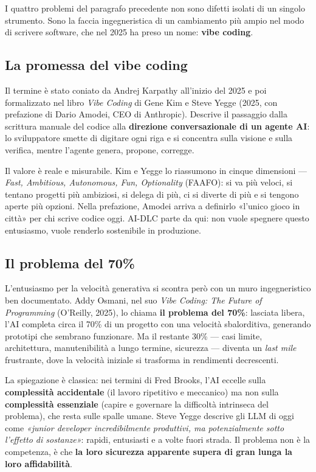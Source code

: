 I quattro problemi del paragrafo precedente non sono difetti isolati di un singolo strumento. Sono la faccia ingegneristica di un cambiamento più ampio nel modo di scrivere software, che nel 2025 ha preso un nome: \textbf{vibe coding}.

\subsection*{La promessa del vibe coding}

Il termine è stato coniato da Andrej Karpathy all'inizio del 2025 e poi formalizzato nel libro \textit{Vibe Coding} di Gene Kim e Steve Yegge (2025, con prefazione di Dario Amodei, CEO di Anthropic). Descrive il passaggio dalla scrittura manuale del codice alla \textbf{direzione conversazionale di un agente AI}: lo sviluppatore smette di digitare ogni riga e si concentra sulla visione e sulla verifica, mentre l'agente genera, propone, corregge.

Il valore è reale e misurabile. Kim e Yegge lo riassumono in cinque dimensioni --- \textit{Fast, Ambitious, Autonomous, Fun, Optionality} (FAAFO): si va più veloci, si tentano progetti più ambiziosi, si delega di più, ci si diverte di più e si tengono aperte più opzioni. Nella prefazione, Amodei arriva a definirlo «l'unico gioco in città» per chi scrive codice oggi. AI-DLC parte da qui: non vuole spegnere questo entusiasmo, vuole renderlo sostenibile in produzione.

\subsection*{Il problema del 70\%}

L'entusiasmo per la velocità generativa si scontra però con un muro ingegneristico ben documentato. Addy Osmani, nel suo \textit{Vibe Coding: The Future of Programming} (O'Reilly, 2025), lo chiama \textbf{il problema del 70\%}: lasciata libera, l'AI completa circa il 70\% di un progetto con una velocità sbalorditiva, generando prototipi che sembrano funzionare. Ma il restante 30\% --- casi limite, architettura, manutenibilità a lungo termine, sicurezza --- diventa un \textit{last mile} frustrante, dove la velocità iniziale si trasforma in rendimenti decrescenti.

La spiegazione è classica: nei termini di Fred Brooks, l'AI eccelle sulla \textbf{complessità accidentale} (il lavoro ripetitivo e meccanico) ma non sulla \textbf{complessità essenziale} (capire e governare la difficoltà intrinseca del problema), che resta sulle spalle umane. Steve Yegge descrive gli LLM di oggi come \textit{«junior developer incredibilmente produttivi, ma potenzialmente sotto l'effetto di sostanze»}: rapidi, entusiasti e a volte fuori strada. Il problema non è la competenza, è che \textbf{la loro sicurezza apparente supera di gran lunga la loro affidabilità}.

